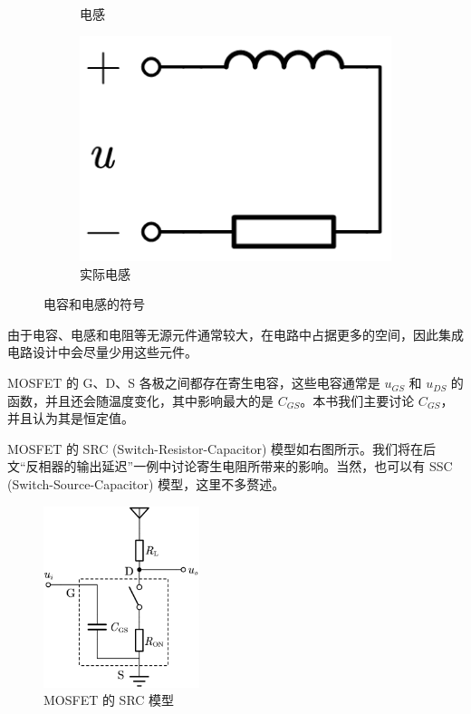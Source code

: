 \documentclass[UTF8]{report}
\theoremstyle{MyLineTheoremStyle} %
\theoremstyle{MyBlockTheoremStyle} %
\theoremstyle{MySubsubsectionStyle} %
\begin{document}
\begin{figure}[H]
\begin{subfigure}[b]{0.21\columnwidth}
    \vspace*{3mm}
    \caption{电感}
\end{subfigure}
\begin{subfigure}[b]{0.21\columnwidth}\centering
    \includegraphics[width=\columnwidth]{assets/5/实际电感.png}
    \caption{实际电感}
\end{subfigure}
\caption{电容和电感的符号}
\end{figure}


\begin{center}
\noindent\begin{minipage}{0.49\columnwidth}
    \hspace*{2em} 由于电容、电感和电阻等无源元件通常较大，在电路中占据更多的空间，因此集成电路设计中会尽量少用这些元件。

    \hspace*{2em} MOSFET 的 G、D、S 各极之间都存在寄生电容，这些电容通常是 $u_{GS}$ 和 $u_{DS}$ 的函数，并且还会随温度变化，其中影响最大的是 $C_{GS}$。本书我们主要讨论 $C_{GS}$，并且认为其是恒定值。
    
    MOSFET 的 SRC (Switch-Resistor-Capacitor) 模型如右图所示。我们将在后文“反相器的输出延迟”一例中讨论寄生电阻所带来的影响。当然，也可以有 SSC (Switch-Source-Capacitor) 模型，这里不多赘述。
\end{minipage}\hfill\begin{minipage}{0.4\columnwidth}
\begin{figure}[H]\centering
\includegraphics[height=150pt]{assets/5/MOSFET SRC模型.png}
\caption{MOSFET 的 SRC 模型}\label{MOSFET SRC模型}
\end{figure}
\end{minipage}\end{center}
\end{document}
